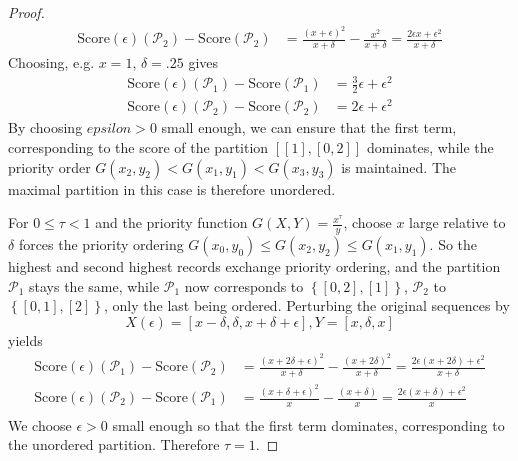 \documentclass{article}
\theoremstyle{case}
\begin{document}
\begin{proof}
\begin{align*}
\text{Score}\left(\epsilon \right)\left(\mathcal{P}_2 \right) - \text{Score}\left(\mathcal{P}_2 \right) &= \frac{\left( x + \epsilon\right)^2}{x + \delta}  - \frac{x^2}{x+\delta}= \frac{2\epsilon x + \epsilon^2}{x+\delta}
\end{align*}
Choosing, e.g. $x = 1$, $\delta = .25$ gives 
\begin{align*}
\text{Score}\left(\epsilon \right)\left(\mathcal{P}_1 \right) - \text{Score}\left(\mathcal{P}_1 \right) &= \frac{3}{2}\epsilon + \epsilon^2 \\
\text{Score}\left(\epsilon \right)\left(\mathcal{P}_2 \right) - \text{Score}\left(\mathcal{P}_2 \right) &= 2\epsilon + \epsilon^2
\end{align*}
By choosing $epsilon > 0$ small enough, we can ensure that the first term, corresponding to the score of the partition $\left[ \left[ 1\right], \left[ 0, 2\right]\right]$ dominates, while the priority order $G(x_2, y_2) < G(x_1, y_1) < G(x_3, y_3)$ is maintained. The maximal partition in this case is therefore unordered.


For $ 0 \leq \tau < 1$ and the priority function $G(X,Y) = \frac{x^{\tau}}{y}$, choose $x$ large relative to $\delta$ forces the priority ordering $G(x_0, y_0) \leq G(x_2, y_2) \leq G(x_1, y_1)$. So the  highest and second highest records exchange priority ordering, and the partition $\mathcal{P}_1$ stays the same, while $\mathcal{P}_1$ now corresponds to $\left\lbrace \left[ 0, 2\right], \left[ 1\right]\right\rbrace$, $\mathcal{P}_2$ to $\left\lbrace \left[ 0, 1\right], \left[ 2\right]\right\rbrace$, only the last being ordered. Perturbing the original sequences by
\[
X\left(\epsilon\right) = \left[ x-\delta, \delta, x + \delta + \epsilon\right], Y = \left[ x, \delta, x\right]
\]
yields
\begin{align*}
\text{Score}\left(\epsilon \right)\left(\mathcal{P}_1 \right) - \text{Score}\left(\mathcal{P}_2 \right) &= \frac{\left( x + 2\delta + \epsilon\right)^2}{x + \delta}  - \frac{\left( x + 2\delta\right)^2}{x + \delta} = \frac{2\epsilon\left( x + 2\delta\right) + \epsilon^2}{x + \delta} \\
\text{Score}\left(\epsilon \right)\left(\mathcal{P}_2 \right) - \text{Score}\left(\mathcal{P}_1 \right) &= \frac{\left( x + \delta + \epsilon\right)^2}{x} - \frac{\left( x + \delta\right)}{x} = \frac{2\epsilon\left( x + \delta \right) + \epsilon^2}{x} \\
\end{align*}
We choose $\epsilon > 0$ small enough so that the first term dominates, corresponding to the unordered partition. Therefore $\tau = 1$.

\end{proof} 
\end{document}
